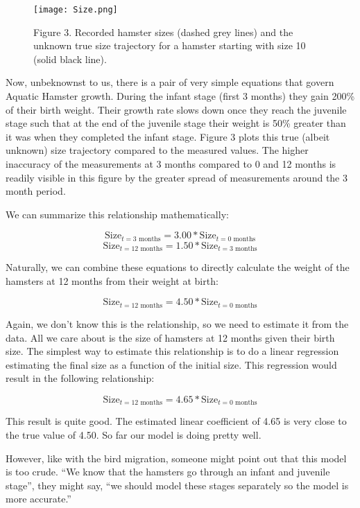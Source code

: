 \documentclass[]{memoir}
\let\Oldincludegraphics\includegraphics
\renewcommand{\includegraphics}[1]{\Oldincludegraphics[max size={\textwidth}{\textheight}]{#1}}
\begin{document}
\begin{figure}[htbp]
\centering
\texttt{[image: Size.png]}
\caption{Figure 3. Recorded hamster sizes (dashed grey lines) and the
unknown true size trajectory for a hamster starting with size 10 (solid
black line).}
\end{figure}

Now, unbeknownst to us, there is a pair of very simple equations that
govern Aquatic Hamster growth. During the infant stage (first 3 months)
they gain 200\% of their birth weight. Their growth rate slows down once
they reach the juvenile stage such that at the end of the juvenile stage
their weight is 50\% greater than it was when they completed the infant
stage. Figure 3 plots this true (albeit unknown) size trajectory
compared to the measured values. The higher inaccuracy of the
measurements at 3 months compared to 0 and 12 months is readily visible
in this figure by the greater spread of measurements around the 3 month
period.

We can summarize this relationship mathematically:

\[ \text{Size}_{t=\text{3 months}} = 3.00 * \text{Size}_{t=\text{0 months}} \]
\[ \text{Size}_{t=\text{12 months}} = 1.50 * \text{Size}_{t=\text{3 months}} \]

Naturally, we can combine these equations to directly calculate the
weight of the hamsters at 12 months from their weight at birth:

\[ \text{Size}_{t=\text{12 months}} = 4.50 * \text{Size}_{t=\text{0 months}} \]

Again, we don't know this is the relationship, so we need to estimate it
from the data. All we care about is the size of hamsters at 12 months
given their birth size. The simplest way to estimate this relationship
is to do a linear regression estimating the final size as a function of
the initial size. This regression would result in the following
relationship:

\[ \text{Size}_{t=\text{12 months}} = 4.65 * \text{Size}_{t=\text{0 months}} \]

This result is quite good. The estimated linear coefficient of 4.65 is
very close to the true value of 4.50. So far our model is doing pretty
well.

However, like with the bird migration, someone might point out that this
model is too crude. ``We know that the hamsters go through an infant and
juvenile stage'', they might say, ``we should model these stages
separately so the model is more accurate.''
\end{document}
